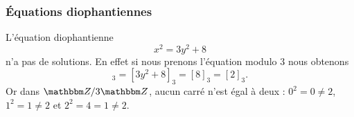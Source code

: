 \subsubsection{Équations diophantiennes}

\begin{example} \label{ExZPVFooPpdKJc}
    L'équation diophantienne
    \begin{equation}
        x^2=3y^2+8
    \end{equation}
    n'a pas de solutions. En effet si nous prenons l'équation modulo \( 3\) nous obtenons
    \begin{equation}
        [x^2]_3=[3y^2+8]_3=[8]_3=[2]_3.
    \end{equation}
    Or dans \( \eZ/3\eZ\), aucun carré n'est égal à deux : \( 0^2=0\neq 2\), \( 1^2=1\neq 2\) et \( 2^2=4=1\neq 2\).
\end{example}

